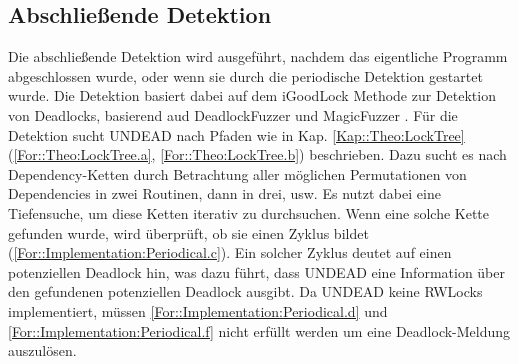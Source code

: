 \subsection{Abschließende Detektion} \label{Kap::UNDEAD:Abschließende}
Die abschließende Detektion wird ausgeführt, nachdem das eigentliche Programm
abgeschlossen wurde, oder wenn sie durch die periodische Detektion gestartet wurde.
Die Detektion basiert dabei auf dem iGoodLock Methode 
zur Detektion von Deadlocks, basierend aud DeadlockFuzzer \cite{Joshi} und 
MagicFuzzer \cite{Cai}. Für die Detektion sucht UNDEAD nach Pfaden wie in Kap.
\ref{Kap::Theo:LockTree} (\eqref{For::Theo:LockTree.a}, \eqref{For::Theo:LockTree.b})
beschrieben. Dazu sucht es nach Dependency-Ketten 
durch Betrachtung aller möglichen Permutationen von Dependencies in zwei Routinen, dann 
in drei, usw. Es nutzt dabei 
eine Tiefensuche, um diese Ketten iterativ zu durchsuchen. Wenn eine solche Kette 
gefunden wurde, wird überprüft, ob sie einen Zyklus bildet 
(\eqref{For::Implementation:Periodical.c}).
Ein solcher Zyklus deutet auf einen potenziellen Deadlock hin, was dazu 
führt, dass UNDEAD eine Information über den gefundenen potenziellen Deadlock ausgibt.
Da UNDEAD keine RWLocks implementiert, müssen \eqref{For::Implementation:Periodical.d}
und \eqref{For::Implementation:Periodical.f} nicht erfüllt werden um eine Deadlock-Meldung
auszulösen.


